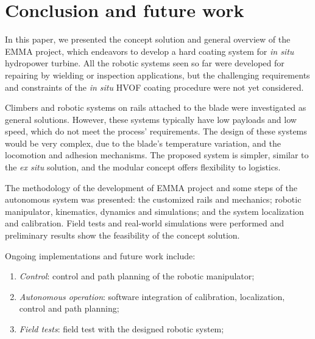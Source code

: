 \section{Conclusion and future work}

In this paper, we presented the concept solution and general overview of the
EMMA project, which endeavors to develop a hard coating system for \textit{in
situ} hydropower turbine. All the robotic systems seen so far were developed for
repairing by wielding or inspection applications, but the challenging
requirements and constraints of the \textit{in situ} HVOF coating procedure
were not yet considered. 

Climbers and robotic systems on rails attached to the blade were investigated as
general solutions. However, these systems typically have low payloads and low
speed, which do not meet the process' requirements. The design of these systems
would be very complex, due to the blade's temperature variation, and the
locomotion and adhesion mechanisms. The proposed system is simpler, similar to
the \textit{ex situ} solution, and the modular concept offers flexibility to
logistics.

The methodology of the development of EMMA project and some steps
of the autonomous system was presented: the customized rails and mechanics;
robotic manipulator, kinematics, dynamics and simulations; and the system
localization and calibration. Field tests and real-world simulations were
performed and preliminary results show the feasibility of the concept solution.

Ongoing implementations and future work include:
\begin{enumerate}
 	\item \textit{Control}: control and path planning of the robotic
 	manipulator;
  	\item \textit{Autonomous operation}: software integration of calibration,
  	localization, control and path planning;
  	\item \textit{Field tests}: field test with the designed robotic system;
\end{enumerate}